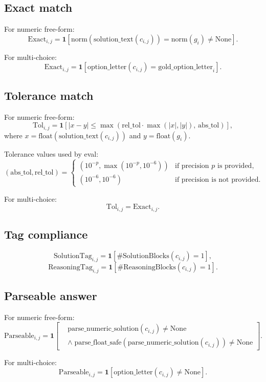 \documentclass[11pt]{article}
\newcommand{\ind}{\mathbf{1}}
\newcommand{\None}{\mathrm{None}}
\begin{document}
\subsection*{Exact match}
For numeric free-form:
\[
\mathrm{Exact}_{i,j}
=
\ind\!\left[
\mathrm{norm}(\mathrm{solution\_text}(c_{i,j}))
=
\mathrm{norm}(g_i)
\neq
\None
\right].
\]

For multi-choice:
\[
\mathrm{Exact}_{i,j}
=
\ind\!\left[
\mathrm{option\_letter}(c_{i,j}) = \mathrm{gold\_option\_letter}_i
\right].
\]

\subsection*{Tolerance match}
For numeric free-form:
\[
\mathrm{Tol}_{i,j}
=
\ind\!\left[
\left|x-y\right|
\le
\max\!\left(\mathrm{rel\_tol}\cdot\max(|x|,|y|),\,\mathrm{abs\_tol}\right)
\right],
\]
where $x = \mathrm{float}(\mathrm{solution\_text}(c_{i,j}))$ and $y=\mathrm{float}(g_i)$.

Tolerance values used by eval:
\[
(\mathrm{abs\_tol}, \mathrm{rel\_tol}) =
\begin{cases}
(10^{-p}, \max(10^{-p}, 10^{-6})) & \text{if precision } p \text{ is provided}, \\
(10^{-6}, 10^{-6}) & \text{if precision is not provided.}
\end{cases}
\]

For multi-choice:
\[
\mathrm{Tol}_{i,j} = \mathrm{Exact}_{i,j}.
\]

\subsection*{Tag compliance}
\[
\mathrm{SolutionTag}_{i,j}
=
\ind\!\left[
\#\mathrm{SolutionBlocks}(c_{i,j}) = 1
\right],
\]
\[
\mathrm{ReasoningTag}_{i,j}
=
\ind\!\left[
\#\mathrm{ReasoningBlocks}(c_{i,j}) = 1
\right].
\]

\subsection*{Parseable answer}
For numeric free-form:
\[
\mathrm{Parseable}_{i,j}
=
\ind\!\left[
\begin{aligned}
&\mathrm{parse\_numeric\_solution}(c_{i,j}) \neq \None \\
&\wedge\;
\mathrm{parse\_float\_safe}(\mathrm{parse\_numeric\_solution}(c_{i,j})) \neq \None
\end{aligned}
\right].
\]

For multi-choice:
\[
\mathrm{Parseable}_{i,j}
=
\ind\!\left[
\mathrm{option\_letter}(c_{i,j}) \neq \None
\right].
\]
\end{document}
